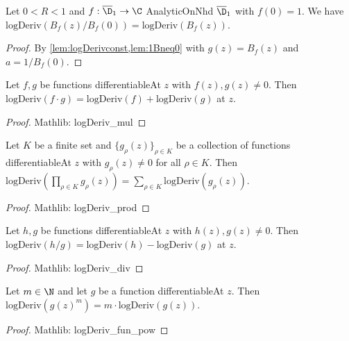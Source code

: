 \begin{lemma}\label{lem:Lf_deriv_is_logBf_deriv} 
\leanok
Let $0<R<1$ and $f:\overline{\D}_1\to\C$ AnalyticOnNhd $\overline{\D}_1$ with $f(0)=1$. We have $\text{logDeriv}(B_f(z)/B_f(0))=\text{logDeriv}(B_f(z))$.
\end{lemma}
\begin{proof}
\leanok
{}
By \cref{lem:logDerivconst,lem:1Bneq0} with $g(z)=B_f(z)$ and $a=1/B_f(0)$.
\end{proof}

\begin{lemma}\label{lem:logDerivmul} 
\leanok
Let $f,g$ be functions differentiableAt $z$ with $f(z),g(z)\neq0$. Then $\text{logDeriv}(f\cdot g) =  \text{logDeriv}(f)+\text{logDeriv}(g)$ at $z$.
\end{lemma}
\begin{proof}
\leanok
Mathlib: logDeriv\_mul
\end{proof}


\begin{lemma}\label{lem:logDerivprod} 
\leanok
Let $K$ be a finite set and $\{g_\rho(z)\}_{\rho \in K}$ be a collection of functions differentiableAt $z$ with $g_\rho(z)\neq0$ for all $\rho\in K$. Then $\text{logDeriv}(\prod_{\rho \in K} g_\rho(z)) = \sum_{\rho \in K} \text{logDeriv}(g_\rho(z))$.
\end{lemma}
\begin{proof}
\leanok
Mathlib: logDeriv\_prod
\end{proof}

\begin{lemma}\label{lem:logDerivdiv} 
\leanok
Let $h,g$ be functions differentiableAt $z$ with $h(z),g(z)\neq0$. Then $\text{logDeriv}(h/g) =  \text{logDeriv}(h)-\text{logDeriv}(g)$ at $z$.
\end{lemma}
\begin{proof}
\leanok
Mathlib: logDeriv\_div
\end{proof}

\begin{lemma}\label{lem:logDerivfunpow} 
\leanok
Let $m\in\N$ and let $g$ be a function differentiableAt $z$. Then  $\text{logDeriv}(g(z)^m)=m\cdot\text{logDeriv}(g(z))$.
\end{lemma}
\begin{proof}
\leanok
Mathlib: logDeriv\_fun\_pow
\end{proof}


